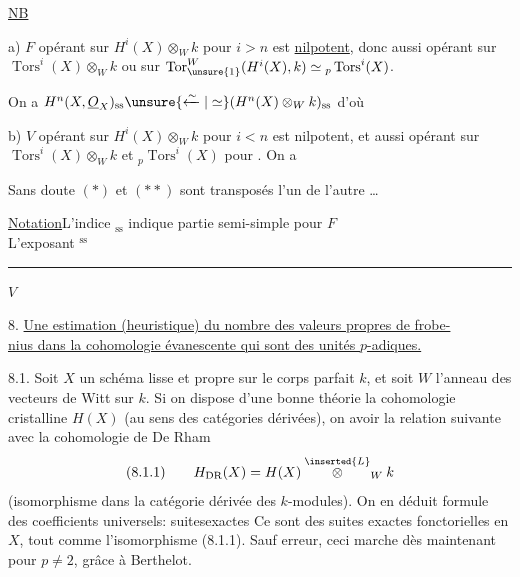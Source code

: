 \uline{NB}

 a) $F$ opérant sur $H^i(X)\otimes_W k$ pour $i>n$ est \uline{nilpotent}, donc aussi opérant sur $\operatorname{Tors}^i(X)\otimes_W k$ ou sur $\operatorname{Tor}_{\unsure{1}}^W(H^i(X),k)\simeq{}_p\operatorname{Tors}^i(X)$.

On a $H^n(X,\underline{O}_X)_{\mathrm{ss}}\unsure{\xleftarrow{\sim}|\simeq}(H^n(X)\otimes_W k)_{\mathrm{ss}}$ d'où

 b) $V$ opérant sur $H^i(X)\otimes_W k$ pour $i<n$ est nilpotent, et aussi opérant sur $\operatorname{Tors}^i(X)\otimes_W k$ et ${}_p\operatorname{Tors}^i(X)$ pour . On a
\margin{$(**)$}

Sans doute $(*)$ et $(**)$ sont transposés l'un de l'autre \ldots

\uline{Notation}\quad L'indice ${}_{\mathrm{ss}}$ indique partie semi-simple pour $F$\\
L'exposant ${}^{\mathrm{ss}}$ \rule{7cm}{.3pt} $V$


8. \uline{Une estimation (heuristique) du nombre des valeurs propres de frobe-}\\
\uline{nius dans la cohomologie évanescente qui sont des unités $p$-adiques.}

8.1. Soit $X$ un schéma lisse et propre sur le corps parfait $k$,  et soit $W$ l'anneau des vecteurs de Witt sur $k$. Si on dispose d'une bonne théorie  la cohomologie cristalline $H(X)$ (au sens des catégories dérivées), on  avoir la relation suivante avec la cohomologie de De Rham
\[
(8.1.1)\qquad H_{\mathrm{DR}}(X)=H(X)\overset{\inserted{L}}{\otimes}_W k
\]
(isomorphisme dans la catégorie dérivée des $k$-modules). On en déduit  formule des coefficients universels: suitesexactes
Ce sont des suites exactes fonctorielles en $X$, tout comme l'isomorphisme (8.1.1). Sauf erreur,  ceci marche dès maintenant pour $p\ne2$, grâce à Berthelot.

